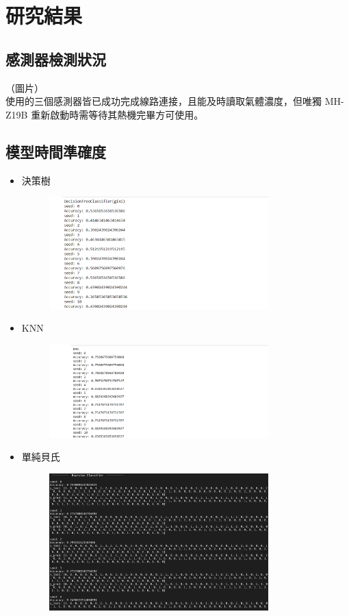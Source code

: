 \chapter{研究結果}

\section{感測器檢測狀況}
（圖片）\\
使用的三個感測器皆已成功完成線路連接，且能及時讀取氣體濃度，但唯獨 MH-Z19B 重新啟動時需等待其熱機完畢方可使用。

\section{模型時間準確度}
\begin{itemize}
	\item 決策樹\\
	\begin{figure}[H]
		\centering
		\includegraphics[width=0.8\textwidth]{pic/decisiontree.png}
	\end{figure}
	\item KNN\\
	\begin{figure}[H]
		\centering
		\includegraphics[width=0.8\textwidth]{pic/knn.png}
	\end{figure}
	\item 單純貝氏\\
	\begin{figure}[H]
		\centering
		\includegraphics[width=0.8\textwidth]{pic/Bayesian.png}

\end{figure}
\end{itemize}
